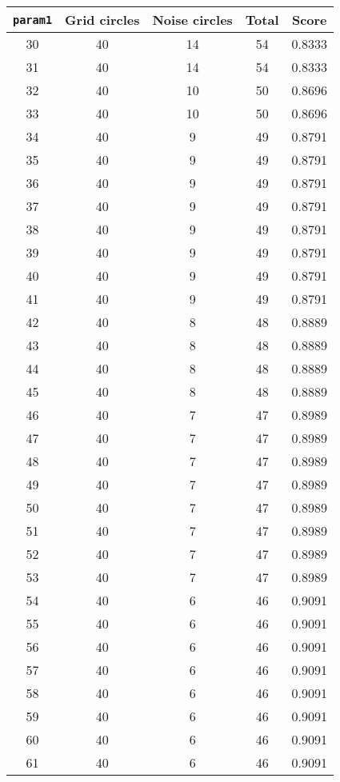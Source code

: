 \documentclass[letterpaper, 12pt]{article}
\begin{document}
\begin{longtable}{|c|c|c|c|c|}
\hline
\textbf{\texttt{param1}} & \textbf{Grid circles} & \textbf{Noise circles} & \textbf{Total} & \textbf{Score} \\
\hline
30 & 40 & 14 & 54 & 0.8333 \\
\hline
31 & 40 & 14 & 54 & 0.8333 \\
\hline
32 & 40 & 10 & 50 & 0.8696 \\
\hline
33 & 40 & 10 & 50 & 0.8696 \\
\hline
34 & 40 & 9 & 49 & 0.8791 \\
\hline
35 & 40 & 9 & 49 & 0.8791 \\
\hline
36 & 40 & 9 & 49 & 0.8791 \\
\hline
37 & 40 & 9 & 49 & 0.8791 \\
\hline
38 & 40 & 9 & 49 & 0.8791 \\
\hline
39 & 40 & 9 & 49 & 0.8791 \\
\hline
40 & 40 & 9 & 49 & 0.8791 \\
\hline
41 & 40 & 9 & 49 & 0.8791 \\
\hline
42 & 40 & 8 & 48 & 0.8889 \\
\hline
43 & 40 & 8 & 48 & 0.8889 \\
\hline
44 & 40 & 8 & 48 & 0.8889 \\
\hline
45 & 40 & 8 & 48 & 0.8889 \\
\hline
46 & 40 & 7 & 47 & 0.8989 \\
\hline
47 & 40 & 7 & 47 & 0.8989 \\
\hline
48 & 40 & 7 & 47 & 0.8989 \\
\hline
49 & 40 & 7 & 47 & 0.8989 \\
\hline
50 & 40 & 7 & 47 & 0.8989 \\
\hline
51 & 40 & 7 & 47 & 0.8989 \\
\hline
52 & 40 & 7 & 47 & 0.8989 \\
\hline
53 & 40 & 7 & 47 & 0.8989 \\
\hline
54 & 40 & 6 & 46 & 0.9091 \\
\hline
55 & 40 & 6 & 46 & 0.9091 \\
\hline
56 & 40 & 6 & 46 & 0.9091 \\
\hline
57 & 40 & 6 & 46 & 0.9091 \\
\hline
58 & 40 & 6 & 46 & 0.9091 \\
\hline
59 & 40 & 6 & 46 & 0.9091 \\
\hline
60 & 40 & 6 & 46 & 0.9091 \\
\hline
61 & 40 & 6 & 46 & 0.9091 \\

\end{longtable}
\end{document}
